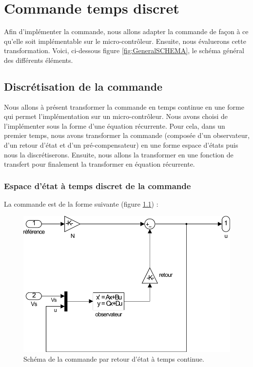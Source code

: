 \chapter{Commande temps discret}
Afin d'implémenter la commande,  nous allons adapter la commande de façon à ce qu'elle soit implémentable sur le micro-contrôleur. Ensuite, nous évaluerons cette transformation. Voici, ci-dessous figure \ref{fig:GeneralSCHEMA}, le schéma général des différents éléments.	

	  	
	  	
	  	

\section{Discrétisation de la commande}
Nous allons à présent transformer la commande en temps continue en une forme qui permet l'implémentation sur un micro-contrôleur. Nous avons choisi de l'implémenter sous la forme d'une équation récurrente. Pour cela, dans un premier temps, nous avons transformer la commande (composée d'un observateur, d'un retour d'état et d'un pré-compensateur) en une forme espace d'états puis nous la discrétiserons. Ensuite, nous allons la transformer en une fonction de transfert pour finalement la transformer en équation récurrente.
	\subsection{Espace d'état à temps discret de la commande}
La commande est de la forme suivante (figure \ref{fig:comTC}) : 
\begin{figure}[!ht]
\centering
\includegraphics[width=.4\textwidth]{./V/images/Com_asserv.pdf}
\caption{\label{fig:comTC}Schéma de la commande par retour d'état à temps continue.}
\end{figure}


